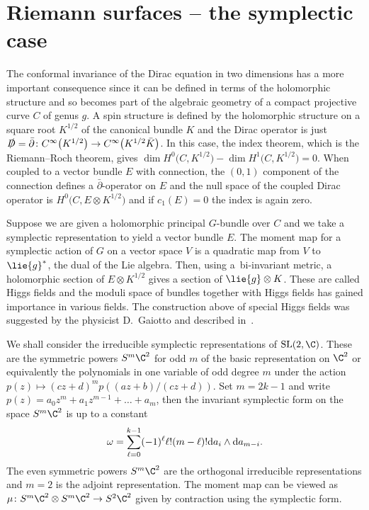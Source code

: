 \section{Riemann surfaces -- the symplectic case}\label{section3}
The conformal invariance of the Dirac equation in two dimensions has a more important consequence since it can be defined in terms of the holomorphic structure and so becomes part of the algebraic geometry of a compact projective curve $C$ of genus $g$. A spin structure is defined by the holomorphic structure on a square root $K^{1/2}$ of the canonical bundle $K$ and the Dirac operator is just $\slashed D=\bar\partial\colon C^{\infty}\big(K^{1/2}\big)\rightarrow C^{\infty}\big(K^{1/2}\bar K\big)$.
In this case, the index theorem, which is the Riemann--Roch theorem, gives $\dim H^0\big(C,K^{1/2}\big)-\dim H^1\big(C, K^{1/2}\big)=0$.
When coupled to a vector bundle $E$ with connection, the $(0,1)$ component of the connection defines a $\bar\partial$-operator on $E$ and the null space of the coupled Dirac operator is $H^0\big(C,E\otimes K^{1/2}\big)$ and if $c_1(E)=0$ the index is again zero.

Suppose we are given a holomorphic principal $G$-bundle over $C$ and we take a symplectic representation to yield a vector bundle $E$. The moment map for a symplectic action of $G$ on a vector space $V$ is a quadratic map from $V$ to $\lie{g}^*$, the dual of the Lie algebra. Then, using a~bi-invariant metric, a holomorphic section of $E\otimes K^{1/2}$ gives a section of $\lie{g}\otimes K$. These are called Higgs fields and the moduli space of bundles together with Higgs fields has gained importance in various fields. The construction above of special Higgs fields was suggested by the physicist D.~Gaiotto \cite{Gaiotto} and described in~\cite{Hitchin2}.

We shall consider the irreducible symplectic representations of ${\rm SL}(2,\C)$. These are the symmetric powers $S^m\C^2$ for odd $m$ of the basic representation on $\C^2$ or equivalently the polynomials in one variable of odd degree $m$ under the action
$p(z)\mapsto (cz+d)^mp((az+b)/(cz+d)).$
 Set $m=2k-1$ and write $p(z)=a_0z^m+a_1z^{m-1}+\dots+a_m$, then the invariant symplectic form on the space $S^m\C^2$ is up to a constant
\begin{equation}
\omega=\sum_{\ell=0}^{k-1}(-1)^{\ell}\ell!(m-\ell)!{\rm d}a_i\wedge {\rm d}a_{m-i}.\label{symp}
\end{equation}
The even symmetric powers $S^{m}\C^2$ are the orthogonal irreducible representations and $m=2$ is the adjoint representation. The moment map can be viewed as $\mu\colon S^m\C^2\otimes S^m\C^2\rightarrow S^2\C^2$ given by contraction using the symplectic form.

